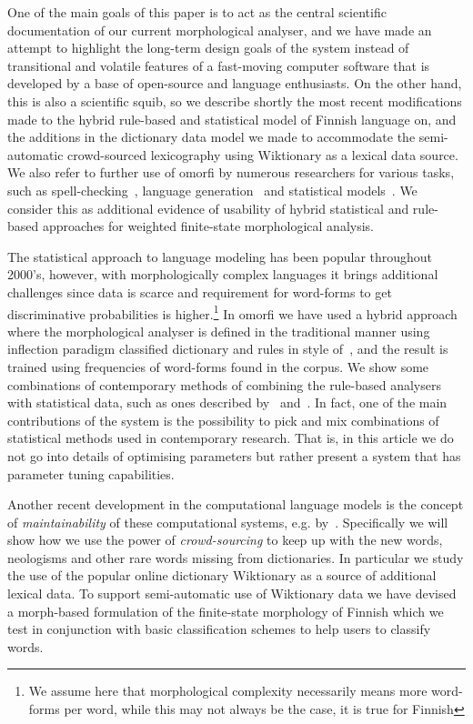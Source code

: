 \documentclass[a4paper,12pt]{article}
\begin{document}
One of the main goals of this paper is to act as the central scientific
documentation of our current morphological analyser, and we have made an
attempt to highlight the long-term design goals of the system instead of
transitional and volatile features of a fast-moving computer software that is
developed by a base of open-source and language enthusiasts. On the other hand,
this is also a scientific squib, so we describe shortly the most recent
modifications made to the hybrid rule-based and statistical model of Finnish
language on, and the additions in the dictionary data model we made to
accommodate the semi-automatic crowd-sourced lexicography using Wiktionary as a
lexical data source.  We also refer to further use of omorfi by numerous
researchers for various tasks, such as
spell-checking~\citep{pirinen2014weighted}, language
generation~\citep{toivanen2012corpus} and statistical
models~\citep{haverinen2013building,bohnet2013joint}. We consider this
as additional evidence of usability of hybrid statistical and rule-based
approaches for weighted finite-state morphological analysis.

The statistical approach to language modeling has been popular throughout
2000's, however, with morphologically complex languages it brings additional
challenges since data is scarce and requirement for word-forms to get
discriminative probabilities is higher.\footnote{We assume here that
morphological complexity necessarily means more word-forms per word, while this
may not always be the case, it is true for Finnish} In omorfi we have used a
hybrid approach where the morphological analyser is defined in the traditional
manner using inflection paradigm classified dictionary and rules in style
of~\citet{koskenniemi1983twolevel}, and the result is trained using frequencies
of word-forms found in the corpus. We show some combinations of contemporary
methods of combining the rule-based analysers with statistical data, such as
ones described by~\citet{pirinen2009weighted} and~\citet{pirinen2012improving}.
In fact, one of the main contributions of the system is the possibility to pick
and mix combinations of statistical methods used in contemporary research. That
is, in this article we do not go into details of optimising parameters but
rather present a system that has parameter tuning capabilities.


Another recent development in the computational language models is the concept
of \emph{maintainability} of these computational systems, e.g.
by~\cite{maxwell2008joint,pirinen2011modularisation}. Specifically we will show
how we use the power of \emph{crowd-sourcing} to keep up with the new words,
neologisms and other rare words missing from dictionaries. In particular we
study the use of the popular online dictionary Wiktionary as a source of
additional lexical data. To support semi-automatic use of Wiktionary data we
have devised a morph-based formulation of the finite-state morphology of
Finnish which we test in conjunction with basic classification schemes to help
users to classify words.
\end{document}

